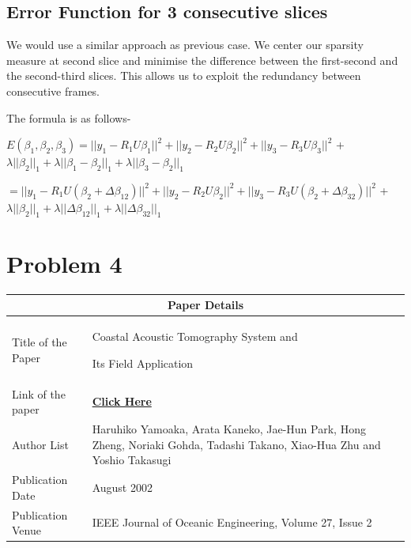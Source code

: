 \documentclass[a4paper,11pt]{article}
\numberwithin{definition}{section}
\numberwithin{mytheorem}{subsection}
\begin{document}
\subsection{Error Function for 3 consecutive slices}

We would use a similar approach as previous case. We center our sparsity measure at second slice and minimise the difference between the first-second and the second-third slices. This allows us to exploit the redundancy between consecutive frames.

The formula is as follows-

$E(\beta_1,\beta_2,\beta_3) =  ||y_1 - R_1U\beta_1||^2 + ||y_2 - R_2U\beta_2||^2 + ||y_3 - R_3U\beta_3||^2$ + $\lambda||\beta_2||_1 + \lambda||\beta_1-\beta_2||_1  + \lambda||\beta_3-\beta_2||_1$

$=  ||y_1 - R_1U(\beta_2 + \Delta\beta_{12})||^2 + ||y_2 - R_2U\beta_2||^2 + ||y_3 - R_3U(\beta_2 + \Delta\beta_{32})||^2$ + $\lambda||\beta_2||_1 + \lambda||\Delta\beta_{12}||_1  + \lambda||\Delta\beta_{32}||_1$






\section{Problem 4}

\begin{center}
    \begin{tabular}{ |p{3.5cm}||p{10cm}|}
   
    \hline
    \multicolumn{2}{|c|}{Paper Details} \\
    \hline
    Title of the Paper& Coastal Acoustic Tomography System and 
    
    Its Field Application\\
    \hline
    Link of the paper  &  \href{https://ieeexplore.ieee.org/document/1002483}{\textbf{Click Here}}  \\
    \hline
    Author List & Haruhiko Yamoaka, Arata Kaneko, Jae-Hun Park, Hong Zheng, Noriaki Gohda, Tadashi Takano, Xiao-Hua Zhu and Yoshio Takasugi \\
    \hline
    Publication Date  & August 2002 \\
    \hline
    Publication Venue  &  IEEE Journal of Oceanic Engineering, Volume 27, Issue 2 \\
    \hline
   \end{tabular}
\end{center}
\end{document}
